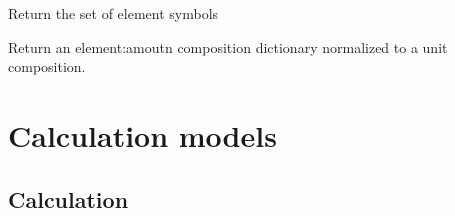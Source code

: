 \documentclass[letterpaper,10pt,english]{sphinxmanual}
\begin{document}
\begin{fulllineitems}

\begin{fulllineitems}
\label{models:qmpy.Composition.space}
Return the set of element symbols

\end{fulllineitems}


\begin{fulllineitems}
\label{models:qmpy.Composition.unit_comp}
Return an element:amoutn composition dictionary normalized to a unit
composition.

\end{fulllineitems}


\end{fulllineitems}



\section{Calculation models}
\label{models:calculation-models}

\subsection{Calculation}
\label{models:calculation}
\end{document}
